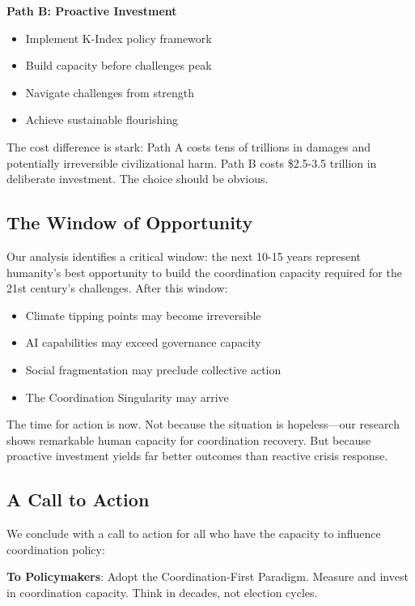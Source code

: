 \documentclass[12pt,letterpaper]{article}
\begin{document}
\textbf{Path B: Proactive Investment}
\begin{itemize}
    \item Implement K-Index policy framework
    \item Build capacity before challenges peak
    \item Navigate challenges from strength
    \item Achieve sustainable flourishing
\end{itemize}

The cost difference is stark: Path A costs tens of trillions in damages and potentially irreversible civilizational harm. Path B costs \$2.5-3.5 trillion in deliberate investment. The choice should be obvious.

\subsection{The Window of Opportunity}

Our analysis identifies a critical window: the next 10-15 years represent humanity's best opportunity to build the coordination capacity required for the 21st century's challenges. After this window:

\begin{itemize}
    \item Climate tipping points may become irreversible
    \item AI capabilities may exceed governance capacity
    \item Social fragmentation may preclude collective action
    \item The Coordination Singularity may arrive
\end{itemize}

The time for action is now. Not because the situation is hopeless---our research shows remarkable human capacity for coordination recovery. But because proactive investment yields far better outcomes than reactive crisis response.

\subsection{A Call to Action}

We conclude with a call to action for all who have the capacity to influence coordination policy:

\textbf{To Policymakers}: Adopt the Coordination-First Paradigm. Measure and invest in coordination capacity. Think in decades, not election cycles.
\end{document}
